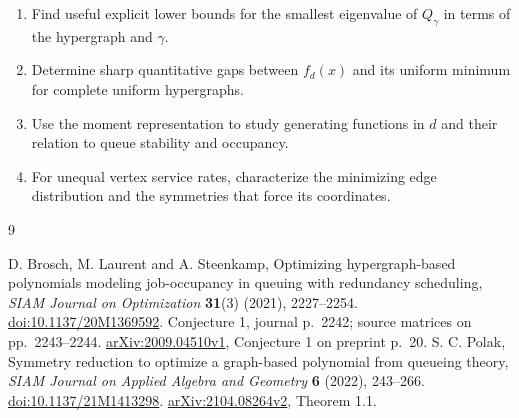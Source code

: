 \documentclass[11pt]{article}
\begin{document}
\begin{enumerate}[label=\textbf{Task \arabic*:},start=2,leftmargin=*]
\item Find useful explicit lower bounds for the smallest eigenvalue
of $Q_\gamma$ in terms of the hypergraph and $\gamma$.
\item Determine sharp quantitative gaps between $f_d(x)$ and its
uniform minimum for complete uniform hypergraphs.
\item Use the moment representation to study generating functions
in $d$ and their relation to queue stability and occupancy.
\item For unequal vertex service rates, characterize the minimizing
edge distribution and the symmetries that force its coordinates.
\end{enumerate}

\small
\begin{thebibliography}{9}
\raggedright
{} D. Brosch, M. Laurent and A. Steenkamp,
Optimizing hypergraph-based polynomials modeling job-occupancy in
queuing with redundancy scheduling,
\emph{SIAM Journal on Optimization} \textbf{31}(3) (2021), 2227--2254.
\href{https://doi.org/10.1137/20M1369592}{doi:10.1137/20M1369592}.
Conjecture 1, journal p.~2242; source matrices on pp.~2243--2244.
\href{https://arxiv.org/abs/2009.04510}{arXiv:2009.04510v1},
Conjecture 1 on preprint p.~20.
 S. C. Polak, Symmetry reduction to optimize a
graph-based polynomial from queueing theory,
\emph{SIAM Journal on Applied Algebra and Geometry}
\textbf{6} (2022), 243--266.
\href{https://doi.org/10.1137/21M1413298}{doi:10.1137/21M1413298}.
\href{https://arxiv.org/abs/2104.08264}{arXiv:2104.08264v2},
Theorem 1.1.
\end{thebibliography}
\end{document}
